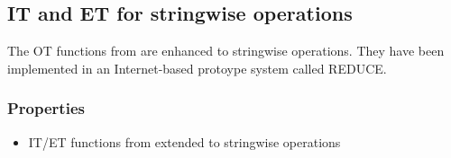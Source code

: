 \subsection{IT and ET for stringwise operations}
\label{otf:sun}

The OT functions from \cite{sun98a} are enhanced to stringwise operations. They have been implemented in an Internet-based protoype system called REDUCE.

\subsubsection{Properties}
\begin{itemize}
 \item IT/ET functions from \cite{sun98a} extended to stringwise operations
\end{itemize}
